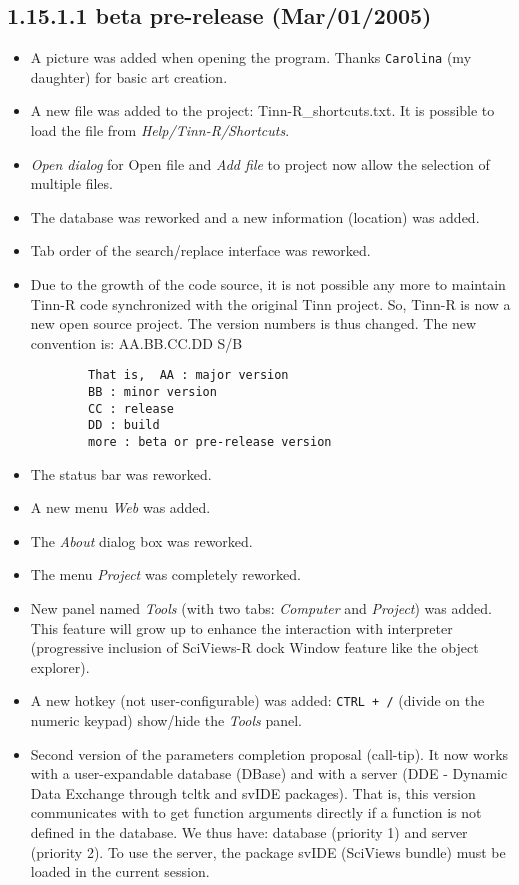 \subsection{1.15.1.1 beta pre-release (Mar/01/2005)}

\begin{itemize}
  \item A picture was added when opening the program. Thanks \texttt{Carolina} (my daughter) for basic art creation.
  \item A new file was added to the project: Tinn-R\_shortcuts.txt. It is possible to load the
    file from \textit{Help/Tinn-R/Shortcuts}.
  \item \textit{Open dialog} for Open file and \textit{Add file} to project now allow the selection of multiple files.
  \item The database was reworked and a new information (location) was added.
  \item Tab order of the search/replace interface was reworked.
  \item Due to the growth of the code source, it is not possible any more to maintain Tinn-R code synchronized 
    with the original Tinn project. So, Tinn-R is now a new open source project. 
    The version numbers is thus changed. The new convention is: AA.BB.CC.DD S/B

    \begin{footnotesize}
      \begin{verbatim}
        That is,  AA : major version
        BB : minor version
        CC : release
        DD : build
        more : beta or pre-release version
      \end{verbatim}
    \end{footnotesize}

  \item The status bar was reworked.
  \item A new menu \textit{Web} was added.
  \item The \textit{About} dialog box was reworked.
  \item The menu \textit{Project} was completely reworked.
  \item New panel named \textit{Tools} (with two tabs: \textit{Computer} and \textit{Project}) was added.
    This feature will grow up to enhance the interaction with \RR{} interpreter
    (progressive inclusion of SciViews-R dock Window feature like the object explorer).
  \item A new hotkey (not user-configurable) was added: \texttt{CTRL + /} (divide on the numeric keypad)
    show/hide the \textit{Tools} panel.
  \item Second version of the \RR{} parameters completion proposal (call-tip).
    It now works with a user-expandable database (DBase) and with a
    \RR{} server (DDE - Dynamic Data Exchange through tcltk and svIDE packages).
    That is, this version communicates with \RR{} to get \RR{} function arguments directly
    if a function is not defined in the database.
    We thus have: database (priority 1) and \RR{} server (priority 2).
    To use the \RR{} server, the package svIDE (SciViews bundle) must be loaded in the current \RR{} session.
\end{itemize}



